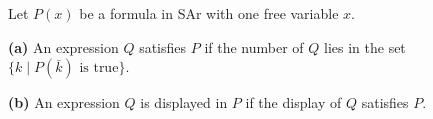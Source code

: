 Let $P(x)$ be a formula in SAr with one free variable $x$.

\textbf{(a)} An expression $Q$ satisfies $P$ if the number of $Q$ lies in the set $\{k \mid P(\bar{k}) \text{ is true}\}$.

\textbf{(b)} An expression $Q$ is displayed in $P$ if the display of $Q$ satisfies $P$.
